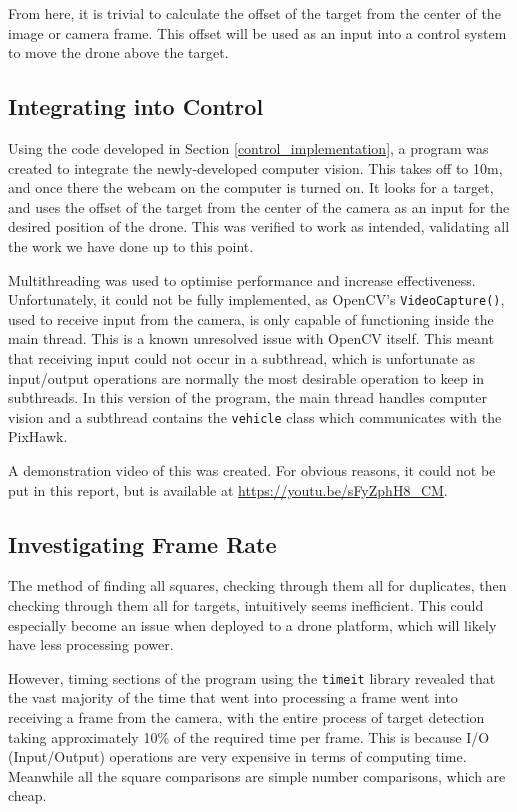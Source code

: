 \documentclass[11pt]{article}
\begin{document}
From here, it is trivial to calculate the offset of the target from the center of the image or camera frame. This offset will be used as an input into a control system to move the drone above the target.

\subsection{Integrating into Control}
Using the code developed in Section \ref{control_implementation}, a program was created to integrate the newly-developed computer vision. This takes off to 10m, and once there the webcam on the computer is turned on. It looks for a target, and uses the offset of the target from the center of the camera as an input for the desired position of the drone. This was verified to work as intended, validating all the work we have done up to this point.

Multithreading was used to optimise performance and increase effectiveness. Unfortunately, it could not be fully implemented, as OpenCV's \lstinline|VideoCapture()|, used to receive input from the camera, is only capable of functioning inside the main thread. This is a known unresolved issue with OpenCV itself. This meant that receiving input could not occur in a subthread, which is unfortunate as input/output operations are normally the most desirable operation to keep in subthreads. In this version of the program, the main thread handles computer vision and a subthread contains the \lstinline|vehicle| class which communicates with the PixHawk. \label{OpenCV_multithreading_issues}

A demonstration video of this was created. For obvious reasons, it could not be put in this report, but is available at \url{https://youtu.be/sFyZphH8_CM}.

\subsection{Investigating Frame Rate}
The method of finding all squares, checking through them all for duplicates, then checking through them all for targets, intuitively seems inefficient. This could especially become an issue when deployed to a drone platform, which will likely have less processing power.

However, timing sections of the program using the \lstinline|timeit| library revealed that the vast majority of the time that went into processing a frame went into receiving a frame from the camera, with the entire process of target detection taking approximately 10\% of the required time per frame. This is because I/O (Input/Output) operations are very expensive in terms of computing time. Meanwhile all the square comparisons are simple number comparisons, which are cheap.
\end{document}

